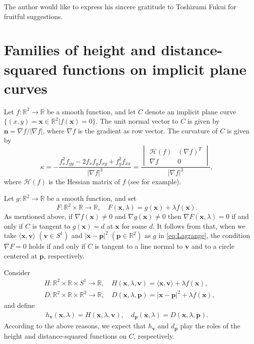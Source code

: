 \documentclass[12pt]{amsart}
\theoremstyle{plain}
\theoremstyle{definition}
\newcommand{\R}{\mathbb{R}}
\newcommand{\n}{\mathbf{n}}
\renewcommand{\v}{\mathbf{v}}
\newcommand{\x}{\mathbf{x}}
\newcommand{\p}{\mathbf{p}}
\begin{document}
The author would like to express his sincere gratitude to Toshizumi Fukui for fruitful suggestions. 


\section{Families of height and distance-squared functions on implicit plane curves}

Let $f:\R^2\to\R$ be a smooth function, and let $C$ denote an implicit plane curve $\{(x,y)=\x\in\R^2|f(\x)=0\}$. The unit normal vector to $C$ is given by $\n=\nabla f/|\nabla f|$, where $\nabla f$ is the gradient as row vector. The curvature of $C$ is given by
\begin{equation}
\label{eq:kappa}
\kappa = -\dfrac{f_x^2 f_{yy} - 2 f_x f_y f_{xy} + f_y^2 f_{xx}}{|\nabla f|^3} = \dfrac{\begin{vmatrix}
\mathcal{H}(f) & (\nabla f)^T \\ 
\nabla f & 0
\end{vmatrix}}
{|\nabla f|^3},
\end{equation}
where $\mathcal{H}(f)$ is the Hessian matrix of $f$ (see \cite{Goldman2005} for example).

Let $g:\R^2\to\R$ be a smooth function, and set
\begin{equation}
\label{eq:Lagrange}
F:\R^2\times\R\to\R,\quad F(\x,\lambda)=g(\x)+\lambda f(\x).
\end{equation}
As mentioned above, if $\nabla f(\x)\ne 0$ and $\nabla g(\x) \ne 0$ then $\nabla F(\x,\lambda) = 0$ if and only if $C$ is tangent to $g(\x)=d$ at $\x$ for some $d$. 
It follows from that, when we take $\langle \x, \v \rangle$ $(\v\in S^1)$ and $|\x-\p|^2$ $(\p\in\R^2)$ as $g$ in \eqref{eq:Lagrange}, the condition $\nabla F=0$ holds if and only if $C$ is tangent to a line normal to $\v$ and to a circle centered at $\p$, respectively.

Consider
\begin{align*}
&H:\R^2\times\R\times S^1 \to \R,\quad H(\x,\lambda,\v) = \langle \x,\v \rangle + \lambda f(\x),\\
&D:\R^2\times\R\times \R^2 \to \R,\quad D(\x,\lambda,\p)=|\x-\p|^2 + \lambda f(\x),
\end{align*}
and define
\begin{align*}
h_{\v}(\x,\lambda)=H(\x,\lambda,\v),\quad
d_{\p}(\x,\lambda)=D(\x,\lambda,\p).
\end{align*}
According to the above reasons, we expect that $h_{\v}$ and $d_{\p}$ play the roles of the height and distance-squared functions on $C$, respectively. 
\end{document}
